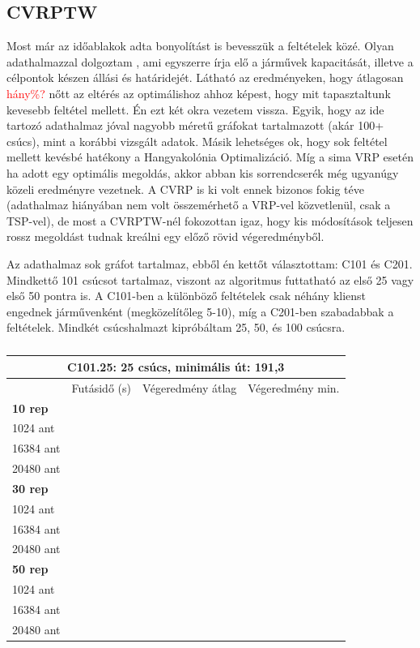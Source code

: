 \subsection{CVRPTW} \label{CVRPTWsection}
Most már az időablakok adta bonyolítást is bevesszük a feltételek közé. Olyan adathalmazzal dolgoztam \cite{VRPTWdataset}, ami egyszerre írja elő a járművek kapacitását, illetve a célpontok készen állási és határidejét. Látható az eredményeken, hogy átlagosan \textcolor{red}{hány\%?} nőtt az eltérés az optimálishoz ahhoz képest, hogy mit tapasztaltunk kevesebb feltétel mellett. Én ezt két okra vezetem vissza. Egyik, hogy az ide tartozó adathalmaz jóval nagyobb méretű gráfokat tartalmazott (akár 100+ csúcs), mint a korábbi vizsgált adatok. Másik lehetséges ok, hogy sok feltétel mellett kevésbé hatékony a Hangyakolónia Optimalizáció. Míg a sima VRP esetén ha adott egy optimális megoldás, akkor abban kis sorrendcserék még ugyanúgy közeli eredményre vezetnek. A CVRP is ki volt ennek bizonos fokig téve (adathalmaz hiányában nem volt összemérhető a VRP-vel közvetlenül, csak a TSP-vel), de most a CVRPTW-nél fokozottan igaz, hogy kis módosítások teljesen rossz megoldást tudnak kreálni egy előző rövid végeredményből.

Az adathalmaz sok gráfot tartalmaz, ebből én kettőt választottam: C101 és C201. Mindkettő 101 csúcsot tartalmaz, viszont az algoritmus futtatható az első 25 vagy első 50 pontra is. A C101-ben a különböző feltételek csak néhány klienst engednek járművenként (megközelítőleg 5-10), míg a C201-ben szabadabbak a feltételek. Mindkét csúcshalmazt kipróbáltam 25, 50, és 100 csúcsra.

\begin{table}[ht!]
	\centering
	\begin{tabular}{|p{2cm}||p{3cm}|p{3.5cm}|p{3.5cm}|}
		\hline
		\multicolumn{4}{|c|}{C101.25: 25 csúcs, minimális út: 191,3} \\
		\hline
		& Futásidő (s) & Végeredmény átlag & Végeredmény min.\\
		\hline
		\textbf{10 rep} & & & \\
		1024 ant &  &  &  \\
		16384 ant &  &  &  \\
		20480 ant &  &  &  \\
		\hline
		\textbf{30 rep} &  &  &  \\
		1024 ant &  &  &  \\
		16384 ant &  &  &  \\
		20480 ant &  &  & \\
		\hline
		\textbf{50 rep} &  &  &  \\
		1024 ant &  &  &  \\
		16384 ant &  &  &  \\
		20480 ant &  &  &  \\
		\hline
	\end{tabular}
	\caption{}
	\label{table:VRTPW_25_1}
\end{table}

